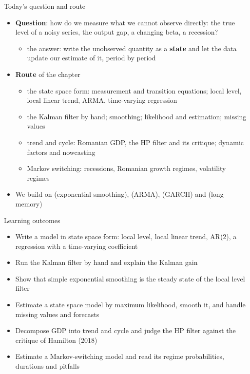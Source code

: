 \begin{frame}{Today's question and route}
\itemsize{\small}
\begin{itemize}
    \item \textbf{Question}: how do we measure what we cannot observe directly: the true level of a noisy series, the output gap, a changing beta, a recession?
    \begin{itemize}
        \item the answer: write the unobserved quantity as a \textbf{state} and let the data update our estimate of it, period by period
    \end{itemize}
    \item \textbf{Route} of the chapter
    \begin{itemize}
        \item the state space form: measurement and transition equations; local level, local linear trend, ARMA, time-varying regression
        \item the Kalman filter by hand; smoothing; likelihood and estimation; missing values
        \item trend and cycle: Romanian GDP, the HP filter and its critique; dynamic factors and nowcasting
        \item Markov switching: recessions, Romanian growth regimes, volatility regimes
    \end{itemize}
    \item We build on  (exponential smoothing),  (ARMA),  (GARCH) and  (long memory)
\end{itemize}
\end{frame}

\begin{frame}{Learning outcomes}
\itemsize{\small}
\begin{itemize}
    \item Write a model in state space form: local level, local linear trend, AR(2), a regression with a time-varying coefficient
    \item Run the Kalman filter by hand and explain the Kalman gain
    \item Show that simple exponential smoothing is the steady state of the local level filter
    \item Estimate a state space model by maximum likelihood, smooth it, and handle missing values and forecasts
    \item Decompose GDP into trend and cycle and judge the HP filter against the critique of Hamilton (2018)
    \item Estimate a Markov-switching model and read its regime probabilities, durations and pitfalls
\end{itemize}
\end{frame}

